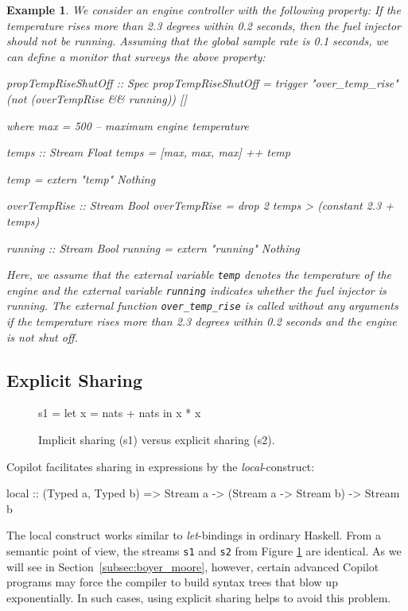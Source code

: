 \documentclass[]{article}
\theoremstyle{example}
\newtheorem{example}{Example}
\begin{document}
\begin{example}
\label{exm:engine}
We consider an engine controller with the following property: If the temperature
rises more than 2.3 degrees within 0.2 seconds, then the fuel injector should
not be running.  Assuming that the global sample rate is 0.1 seconds, we can
define a monitor that surveys the above property:
%
\begin{code}
propTempRiseShutOff :: Spec
propTempRiseShutOff = 
  trigger "over_temp_rise" 
    (not (overTempRise && running)) []

  where
  max = 500 -- maximum engine temperature

  temps :: Stream Float
  temps = [max, max, max] ++ temp

  temp = extern "temp" Nothing

  overTempRise :: Stream Bool
  overTempRise = drop 2 temps > (constant 2.3 + temps)
 
  running :: Stream Bool
  running = extern "running" Nothing
\end{code}
%

Here, we assume that the external variable {\tt temp} denotes the temperature of
the engine and the external variable {\tt running} indicates whether the fuel
injector is running.  The external function {\tt over\_temp\_rise} is called
without any arguments if the temperature rises more than 2.3 degrees within 0.2
seconds and the engine is not shut off.
\end{example}

\subsection{Explicit Sharing}
\label{sec:explicit_sharing}

\begin{figure}[ht]
\begin{minipage}{0.5\textwidth}
\begin{code}
s1 = let x = nats + nats
     in x * x
\end{code}
\end{minipage}
\begin{minipage}{0.5\textwidth}
\end{minipage}
\caption{Implicit sharing (s1) versus explicit sharing (s2).}
\label{fig:explicit_sharing}
\end{figure}
\noindent Copilot facilitates sharing in expressions by the \emph{local}-construct:
%
\begin{code}
local
  :: (Typed a, Typed b)
  => Stream a
  -> (Stream a -> Stream b)
  -> Stream b
\end{code}
%
The local construct works similar to \emph{let}-bindings in ordinary Haskell.
From a semantic point of view, the streams {\tt s1} and {\tt s2} from Figure
\ref{fig:explicit_sharing} are identical.
As we will see in Section~\ref{subsec:boyer_moore}, however, certain advanced
Copilot programs may force the compiler to build syntax trees that blow up exponentially.
In such cases, using explicit sharing helps to avoid this problem.
\end{document}
